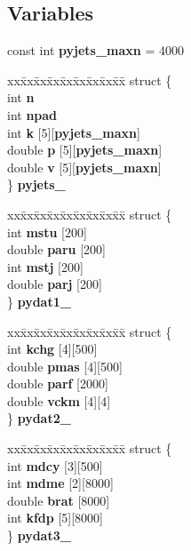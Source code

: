 \subsection*{Variables}
\begin{CompactItemize}
\item 
const int {\bf pyjets\_\-maxn} = 4000
\item 
\begin{tabbing}
xx\=xx\=xx\=xx\=xx\=xx\=xx\=xx\=xx\=\kill
struct \{\\
\>int {\bf n}\\
\>int {\bf npad}\\
\>int {\bf k} [5][{\bf pyjets\_maxn}]\\
\>double {\bf p} [5][{\bf pyjets\_maxn}]\\
\>double {\bf v} [5][{\bf pyjets\_maxn}]\\
\} {\bf pyjets\_}\\

\end{tabbing}\item 
\begin{tabbing}
xx\=xx\=xx\=xx\=xx\=xx\=xx\=xx\=xx\=\kill
struct \{\\
\>int {\bf mstu} [200]\\
\>double {\bf paru} [200]\\
\>int {\bf mstj} [200]\\
\>double {\bf parj} [200]\\
\} {\bf pydat1\_}\\

\end{tabbing}\item 
\begin{tabbing}
xx\=xx\=xx\=xx\=xx\=xx\=xx\=xx\=xx\=\kill
struct \{\\
\>int {\bf kchg} [4][500]\\
\>double {\bf pmas} [4][500]\\
\>double {\bf parf} [2000]\\
\>double {\bf vckm} [4][4]\\
\} {\bf pydat2\_}\\

\end{tabbing}\item 
\begin{tabbing}
xx\=xx\=xx\=xx\=xx\=xx\=xx\=xx\=xx\=\kill
struct \{\\
\>int {\bf mdcy} [3][500]\\
\>int {\bf mdme} [2][8000]\\
\>double {\bf brat} [8000]\\
\>int {\bf kfdp} [5][8000]\\
\} {\bf pydat3\_}\\


\end{tabbing}
\end{CompactItemize}
